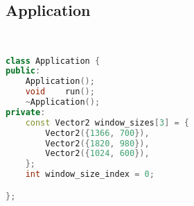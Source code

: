 \subsection{Application}
\begin{lstlisting}[language=C++]


class Application {
public:
    Application();
    void    run();
    ~Application();
private:
    const Vector2 window_sizes[3] = {
        Vector2({1366, 700}), 
        Vector2({1820, 980}), 
        Vector2({1024, 600}),
    };
    int window_size_index = 0;

};






\end{lstlisting}
